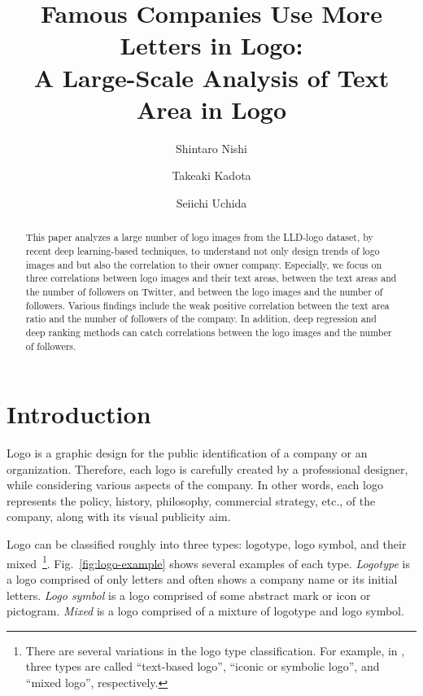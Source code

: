 \documentclass[runningheads]{llncs}
\begin{document}
\title{Famous Companies Use More Letters in Logo:\\ A Large-Scale Analysis of Text Area in Logo}

\author{Shintaro Nishi\and
Takeaki Kadota\and
Seiichi Uchida}
%
%
\maketitle              %
%
\vspace{-0.8cm}
\begin{abstract}
This paper analyzes a large number of logo images from the LLD-logo dataset, by recent deep learning-based techniques, to understand not only design trends of logo images and but also the correlation to their owner company. Especially, we focus on three correlations between logo images and their text areas, between the text areas and the number of followers on Twitter, and between the logo images and the number of followers. Various findings include the weak positive correlation between the text area ratio and the number of followers of the company. In addition, deep regression and deep ranking methods can catch correlations between the logo images and the number of followers.


\end{abstract}
%
%
\section{Introduction} \label{sec:intro}
Logo is a graphic design for the public identification of a company or an organization. Therefore, 
each logo is carefully created by a professional designer, while considering various aspects of 
the company. In other words, each logo represents the policy, history, philosophy, commercial strategy, etc., of the company, along with its visual publicity aim.\par
%
Logo can be classified roughly into three types: logotype, logo symbol, and their mixed~\footnote{There are several variations in the logo type classification. For example, in \cite{Adir:2012}, three types are called ``text-based logo'', ``iconic or symbolic logo'', and ``mixed logo'', respectively.}. Fig.~\ref{fig:logo-example} shows several examples of each type. {\em Logotype} is a logo comprised of only letters and often shows a company name or its initial letters. {\em Logo symbol} is a logo comprised of some abstract mark or icon or pictogram. {\em Mixed} is a logo comprised of a mixture of logotype and logo symbol.\par
%
\end{document}
